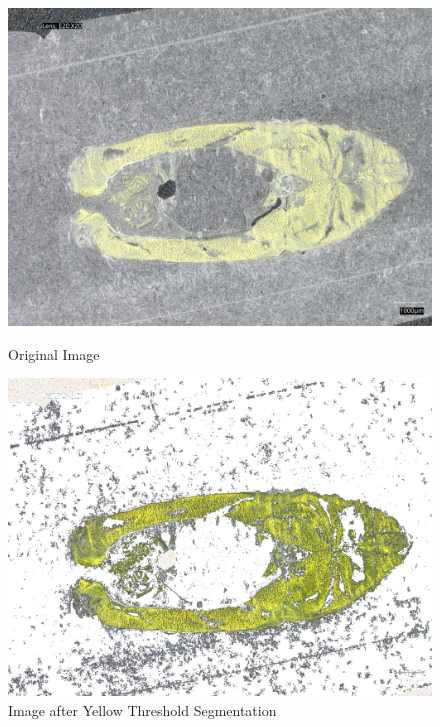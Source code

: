 \begin{figure}
    \centering
    \begin{minipage}{0.45\textwidth}
        \centering
        \includegraphics[width=\textwidth]{./fig/model2/origin20240205_161427.jpg}
        \caption{Original Image}
        \label{fig:origin}
    \end{minipage}
    \begin{minipage}{0.45\textwidth}
        \centering
        \includegraphics[width=\textwidth]{./fig/model2/yellow20240205_161427.jpg}
        \caption{Image after Yellow Threshold Segmentation}
        \label{fig:yellow}
    \end{minipage}
\end{figure}


